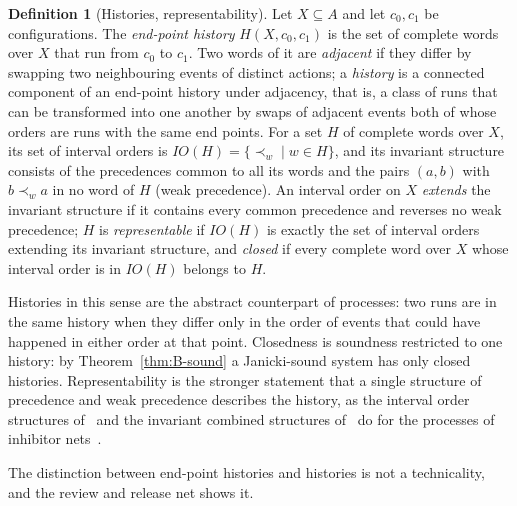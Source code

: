 \documentclass[preprint,12pt]{elsarticle}
\theoremstyle{plain}
\theoremstyle{definition}
\newtheorem{definition}[theorem]{Definition}
\newcommand{\IO}{\mathit{IO}}
\begin{document}
\begin{definition}[Histories, representability]
\label{def:history}
Let $X \subseteq A$ and let $c_0, c_1$ be configurations. The \emph{end-point history} $H(X, c_0, c_1)$ is the set of complete words over $X$ that run from $c_0$ to $c_1$. Two words of it are \emph{adjacent} if they differ by swapping two neighbouring events of distinct actions; a \emph{history} is a connected component of an end-point history under adjacency, that is, a class of runs that can be transformed into one another by swaps of adjacent events both of whose orders are runs with the same end points. For a set $H$ of complete words over $X$, its set of interval orders is $\IO(H) = \{\prec_w \mid w \in H\}$, and its invariant structure consists of the precedences common to all its words and the pairs $(a, b)$ with $b \prec_w a$ in no word of $H$ (weak precedence). An interval order on $X$ \emph{extends} the invariant structure if it contains every common precedence and reverses no weak precedence; $H$ is \emph{representable} if $\IO(H)$ is exactly the set of interval orders extending its invariant structure, and \emph{closed} if every complete word over $X$ whose interval order is in $\IO(H)$ belongs to $H$.
\end{definition}

Histories in this sense are the abstract counterpart of processes: two runs are in the same history when they differ only in the order of events that could have happened in either order at that point. Closedness is soundness restricted to one history: by Theorem~\ref{thm:B-sound} a Janicki-sound system has only closed histories. Representability is the stronger statement that a single structure of precedence and weak precedence describes the history, as the interval order structures of~\cite{JanickiKoutny1993} and the invariant combined structures of~\cite{JanickiKleijnKoutnyMikulski2024} do for the processes of inhibitor nets~\cite{AlqarniJanicki2018}.

The distinction between end-point histories and histories is not a technicality, and the review and release net shows it.
\end{document}
